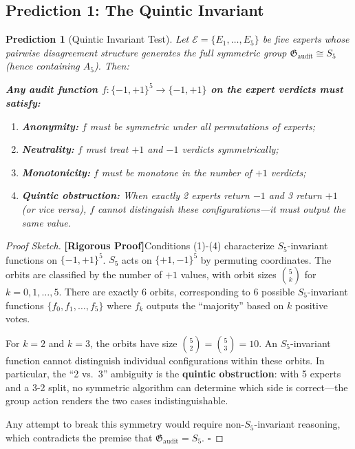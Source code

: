 \documentclass[12pt,a4paper]{article}
\newtheorem{prediction}[theorem]{Prediction}
\theoremstyle{remark}
\newcommand{\AuditGrp}{\mathfrak{G}_{\mathrm{audit}}}
\newcommand{\ExpertSet}{\mathcal{E}}
\newcommand{\rigorous}{\textnormal{\textbf{[Rigorous Proof]}}}
\begin{document}
\subsection{Prediction 1: The Quintic Invariant}
\begin{prediction}[Quintic Invariant Test]\label{pred:quintic}
Let \(\ExpertSet = \{E_1,\ldots,E_5\}\) be five experts whose pairwise disagreement structure generates the full symmetric group \(\AuditGrp \cong S_5\) (hence containing \(A_5\)). Then:
\begin{center}
    \textbf{Any audit function \(f: \{-1,+1\}^5 \to \{-1,+1\}\) on the expert verdicts must satisfy:}\\[4pt]
    \begin{minipage}{0.85\textwidth}
    \begin{enumerate}[label=(\arabic*),itemsep=3pt]
        \item \textbf{Anonymity:} \(f\) must be symmetric under all permutations of experts;
        \item \textbf{Neutrality:} \(f\) must treat \(+1\) and \(-1\) verdicts symmetrically;
        \item \textbf{Monotonicity:} \(f\) must be monotone in the number of \(+1\) verdicts;
        \item \textbf{Quintic obstruction:} When exactly 2 experts return \(-1\) and 3 return \(+1\) (or vice versa), \(f\) cannot distinguish these configurations---it must output the same value.
    \end{enumerate}
    \end{minipage}
\end{center}
\end{prediction}
\begin{proof}[Proof Sketch]
\rigorous Conditions (1)-(4) characterize \(S_5\)-invariant functions on \(\{-1,+1\}^5\). \(S_5\) acts on \(\{+1,-1\}^5\) by permuting coordinates. The orbits are classified by the number of \(+1\) values, with orbit sizes \(\binom{5}{k}\) for \(k = 0,1,\ldots,5\). There are exactly 6 orbits, corresponding to 6 possible \(S_5\)-invariant functions \(\{f_0,f_1,\ldots,f_5\}\) where \(f_k\) outputs the ``majority'' based on \(k\) positive votes.

For \(k=2\) and \(k=3\), the orbits have size \(\binom{5}{2} = \binom{5}{3} = 10\). An \(S_5\)-invariant function cannot distinguish individual configurations within these orbits. In particular, the ``2 vs.\ 3'' ambiguity is the \textbf{quintic obstruction}: with 5 experts and a 3-2 split, no symmetric algorithm can determine which side is correct---the group action renders the two cases indistinguishable.

Any attempt to break this symmetry would require non-\(S_5\)-invariant reasoning, which contradicts the premise that \(\AuditGrp = S_5\). \(\square\)
\end{proof}
\end{document}
